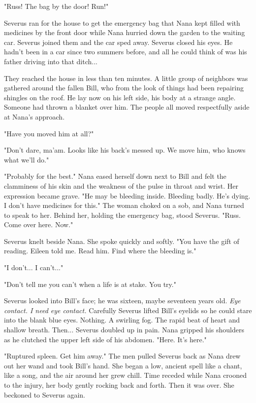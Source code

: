 \documentclass[a4paper,11pt]{article}
\begin{document}
"Russ! The bag by the door! Run!"

Severus ran for the house to get the emergency bag that Nana kept filled with medicines by the front door while Nana hurried down the garden to the waiting car. Severus joined them and the car sped away. Severus closed his eyes. He hadn't been in a car since two summers before, and all he could think of was his father driving into that ditch...

They reached the house in less than ten minutes. A little group of neighbors was gathered around the fallen Bill, who from the look of things had been repairing shingles on the roof. He lay now on his left side, his body at a strange angle. Someone had thrown a blanket over him. The people all moved respectfully aside at Nana's approach.

"Have you moved him at all?"

"Don't dare, ma'am. Looks like his back's messed up. We move him, who knows what we'll do."

"Probably for the best." Nana eased herself down next to Bill and felt the clamminess of his skin and the weakness of the pulse in throat and wrist. Her expression became grave. "He may be bleeding inside. Bleeding badly. He's dying. I don't have medicines for this." The woman choked on a sob, and Nana turned to speak to her. Behind her, holding the emergency bag, stood Severus. "Russ. Come over here. Now."

Severus knelt beside Nana. She spoke quickly and softly. "You have the gift of reading. Eileen told me. Read him. Find where the bleeding is."

"I don't... I can't..."

"Don't tell me you can't when a life is at stake. You try."

Severus looked into Bill's face; he was sixteen, maybe seventeen years old. \emph{Eye contact. I need eye contact.} Carefully Severus lifted Bill's eyelids so he could stare into the blank blue eyes. Nothing. A swirling fog. The rapid beat of heart and shallow breath. Then... Severus doubled up in pain. Nana gripped his shoulders as he clutched the upper left side of his abdomen. "Here. It's here."

"Ruptured spleen. Get him away." The men pulled Severus back as Nana drew out her wand and took Bill's hand. She began a low, ancient spell like a chant, like a song, and the air around her grew chill. Time receded while Nana crooned to the injury, her body gently rocking back and forth. Then it was over. She beckoned to Severus again.
\end{document}
